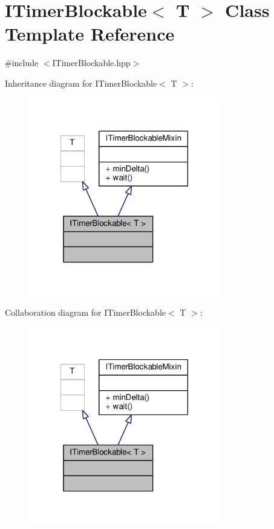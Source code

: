 \hypertarget{class_i_timer_blockable}{\section{I\-Timer\-Blockable$<$ T $>$ Class Template Reference}
\label{class_i_timer_blockable}
}


{\ttfamily \#include $<$I\-Timer\-Blockable.\-hpp$>$}



Inheritance diagram for I\-Timer\-Blockable$<$ T $>$\-:
\nopagebreak
\begin{figure}[H]
\begin{center}
\leavevmode
\includegraphics[width=237pt]{class_i_timer_blockable__inherit__graph}
\end{center}
\end{figure}


Collaboration diagram for I\-Timer\-Blockable$<$ T $>$\-:
\nopagebreak
\begin{figure}[H]
\begin{center}
\leavevmode
\includegraphics[width=237pt]{class_i_timer_blockable__coll__graph}
\end{center}
\end{figure}
